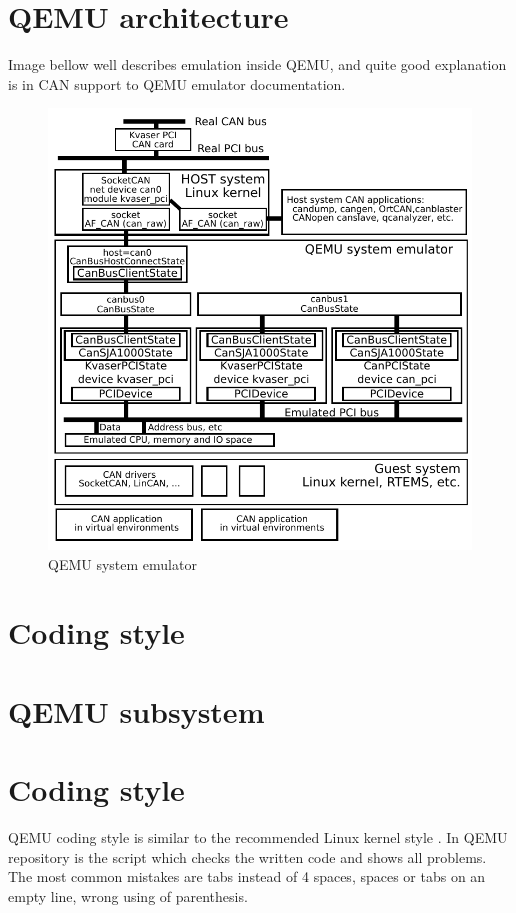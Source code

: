 \documentclass{ctuthesis}
\begin{document}
 \section{QEMU architecture}
  Image bellow well describes emulation inside QEMU, and quite good explanation is in CAN support to QEMU emulator documentation. \cite[page 2-4]{qemu-mainline}
  \begin{figure}[H]
  \includegraphics[width=1\textwidth]{qemu-can-bus}
  \caption{QEMU system emulator \cite{qemu-canbusexplain}}
  \end{figure}
  \section{Coding style}
 
 \section{QEMU subsystem}

 \section{Coding style}
  QEMU coding style \cite{qemu-style} is similar to the recommended Linux kernel style \cite{linux-style}. In QEMU repository is the script which checks the written code and shows all problems. The most common mistakes are tabs instead of 4 spaces, spaces or tabs on an empty line, wrong using of parenthesis.
 
\end{document}
